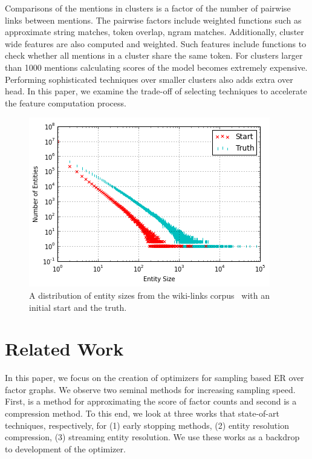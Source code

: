 Comparisons of the mentions in clusters is a factor of the number of pairwise links between mentions.
The pairwise factors include weighted functions such as approximate string matches, token overlap, ngram matches.
Additionally, cluster wide features are also computed and weighted.
Such features include functions to check whether all mentions in a cluster share the same token.
For clusters larger than 1000 mentions calculating scores of the model becomes extremely expensive.
Performing sophisticated techniques over smaller clusters also adds extra over head.
In this paper, we examine the trade-off of selecting techniques to
accelerate the feature computation process.


\begin{figure}
\centering
\includegraphics[width=\columnwidth]{media/start-vs-nd.png}
\caption{A distribution of entity sizes from the wiki-links corpus~\cite{singh12:wiki-links} with an initial start and the truth.}
\label{fig:entity-distribution}
\end{figure}



\section{Related Work}
\label{sec:optimizer:relatedwork}

In this paper, we focus on the creation of optimizers for sampling based ER over factor graphs.
We observe two seminal methods for increasing sampling speed.
First, is a method for approximating the score of factor counts and second is a compression method.
To this end, we look at three works that state-of-art techniques, respectively, for
 (1) early stopping methods,
 (2) entity resolution compression,
 (3) streaming entity resolution.
We use these works as a backdrop to development of the optimizer.

